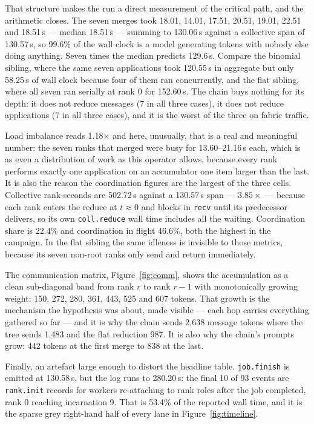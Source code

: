 \documentclass[11pt]{article}
\begin{document}
That structure makes the run a direct measurement of the critical path, and the
arithmetic closes. The seven merges took 18.01, 14.01, 17.51, 20.51, 19.01, 22.51 and
18.51\,s --- median 18.51\,s --- summing to 130.06\,s against a collective span of
130.57\,s, so 99.6\% of the wall clock is a model generating tokens with nobody else
doing anything. Seven times the median predicts 129.6\,s. Compare the binomial sibling,
where the same seven applications took 120.55\,s in aggregate but only 58.25\,s of wall
clock because four of them ran concurrently, and the flat sibling, where all seven ran
serially at rank 0 for 152.60\,s. The chain buys nothing for its depth: it does not
reduce messages (7 in all three cases), it does not reduce applications (7 in all three
cases), and it is the worst of the three on fabric traffic.

Load imbalance reads 1.18$\times$ and here, unusually, that is a real and meaningful
number: the seven ranks that merged were busy for 13.60--21.16\,s each, which is as
even a distribution of work as this operator allows, because every rank performs exactly
one application on an accumulator one item larger than the last. It is also the reason
the coordination figures are the largest of the three cells. Collective rank-seconds are
502.72\,s against a 130.57\,s span --- $3.85\times$ --- because each rank enters the
reduce at $t \approx 0$ and blocks in \texttt{recv} until its predecessor delivers, so
its own \texttt{coll.reduce} wall time includes all the waiting. Coordination share is
22.4\% and coordination in flight 46.6\%, both the highest in the campaign. In the flat
sibling the same idleness is invisible to those metrics, because its seven non-root
ranks only send and return immediately.

The communication matrix, Figure~\ref{fig:comm}, shows the accumulation as a clean
sub-diagonal band from rank $r$ to rank $r-1$ with monotonically growing weight: 150,
272, 280, 361, 443, 525 and 607 tokens. That growth is the mechanism the hypothesis was
about, made visible --- each hop carries everything gathered so far --- and it is why the
chain sends 2{,}638 message tokens where the tree sends 1{,}483 and the flat reduction
987. It is also why the chain's prompts grow: 442 tokens at the first merge to 838 at
the last.

Finally, an artefact large enough to distort the headline table. \texttt{job.finish} is
emitted at 130.58\,s, but the log runs to 280.20\,s: the final 10 of 93 events are
\texttt{rank.init} records for workers re-attaching to rank roles after the job
completed, rank 0 reaching incarnation 9. That is 53.4\% of the reported wall time, and
it is the sparse grey right-hand half of every lane in Figure~\ref{fig:timeline}.
\end{document}

